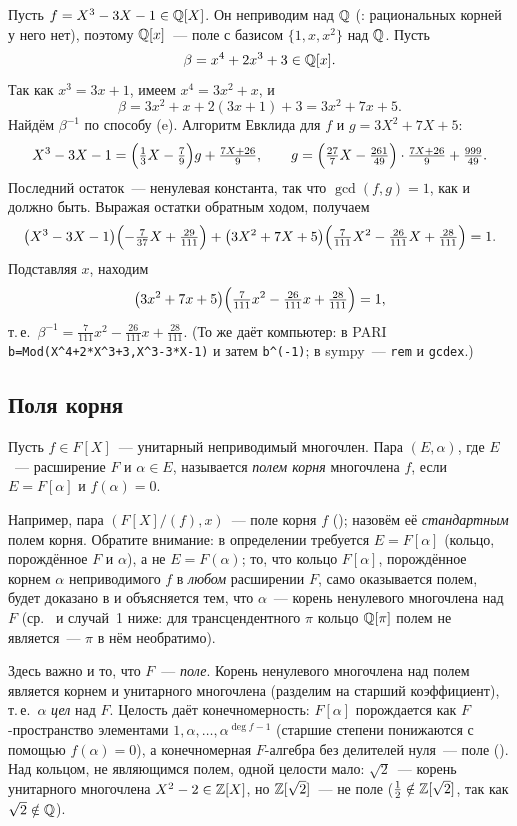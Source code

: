 \begin{example}[1.27]
Пусть $f=X^3-3X-1\in\mathbb Q[X]$. Он неприводим над $\mathbb Q$ (: рациональных корней у него нет), поэтому $\mathbb Q[x]$~--- поле с
базисом $\{1,x,x^2\}$ над $\mathbb Q$. Пусть
\[
\beta=x^4+2x^3+3\in\mathbb Q[x].
\]
Так как $x^3=3x+1$, имеем $x^4=3x^2+x$, и
\[
\beta=3x^2+x+2(3x+1)+3=3x^2+7x+5.
\]
Найдём $\beta^{-1}$ по способу (e). Алгоритм Евклида для $f$ и $g=3X^2+7X+5$:
\[
X^3-3X-1=\Bigl(\tfrac13X-\tfrac79\Bigr)g+\tfrac{7X+26}{9},\qquad
g=\Bigl(\tfrac{27}{7}X-\tfrac{261}{49}\Bigr)\cdot\tfrac{7X+26}{9}+\tfrac{999}{49}.
\]
Последний остаток~--- ненулевая константа, так что $\gcd(f,g)=1$, как и должно быть. Выражая остатки обратным ходом,
получаем
\[
\bigl(X^3-3X-1\bigr)\Bigl(-\tfrac{7}{37}X+\tfrac{29}{111}\Bigr)+\bigl(3X^2+7X+5\bigr)\Bigl(\tfrac{7}{111}X^2-\tfrac{26}{111}X+\tfrac{28}{111}\Bigr)=1.
\]
Подставляя $x$, находим
\[
\bigl(3x^2+7x+5\bigr)\Bigl(\tfrac{7}{111}x^2-\tfrac{26}{111}x+\tfrac{28}{111}\Bigr)=1,
\]
т.\,е.\ $\beta^{-1}=\frac{7}{111}x^2-\frac{26}{111}x+\frac{28}{111}$. (То же даёт компьютер: в PARI
\texttt{b=Mod(X\^{}4+2*X\^{}3+3,X\^{}3-3*X-1)} и затем \texttt{b\^{}(-1)}; в sympy~--- \texttt{rem} и \texttt{gcdex}.)
\end{example}

\subsection*{Поля корня}

\begin{definition}[1.27a]
Пусть $f\in F[X]$~--- унитарный неприводимый многочлен. Пара $(E,\alpha)$, где $E$~--- расширение $F$ и $\alpha\in E$,
называется \emph{полем корня} многочлена $f$, если $E=F[\alpha]$ и $f(\alpha)=0$.
\end{definition}

Например, пара $(F[X]/(f),x)$~--- поле корня $f$ (); назовём её \emph{стандартным} полем корня. Обратите
внимание: в определении требуется $E=F[\alpha]$ (кольцо, порождённое $F$ и $\alpha$), а не $E=F(\alpha)$; то, что кольцо
$F[\alpha]$, порождённое корнем $\alpha$ неприводимого $f$ в \emph{любом} расширении $F$, само оказывается полем, будет
доказано в  и объясняется тем, что $\alpha$~--- корень ненулевого многочлена над $F$ (ср.\  и случай~1
ниже: для трансцендентного $\pi$ кольцо $\mathbb Q[\pi]$ полем не является~--- $\pi$ в нём необратимо).

Здесь важно и то, что $F$~--- \emph{поле}. Корень ненулевого многочлена над полем является корнем и унитарного
многочлена (разделим на старший коэффициент), т.\,е.\ $\alpha$ \emph{цел} над $F$. Целость даёт конечномерность: $F[\alpha]$
порождается как $F$-пространство элементами $1,\alpha,\dots,\alpha^{\deg f-1}$ (старшие степени понижаются с помощью
$f(\alpha)=0$), а конечномерная $F$-алгебра без делителей нуля~--- поле (). Над кольцом, не являющимся полем,
одной целости мало: $\sqrt2$~--- корень унитарного многочлена $X^2-2\in\mathbb Z[X]$, но $\mathbb Z[\sqrt2]$~--- не поле
($\frac12\notin\mathbb Z[\sqrt2]$, так как $\sqrt2\notin\mathbb Q$).

